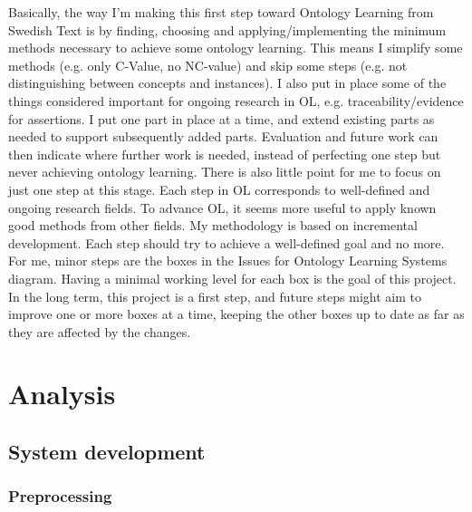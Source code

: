 \documentclass[a4paper]{report}
\begin{document}
Basically, the way I'm making this first step toward Ontology Learning from Swedish Text is by finding, choosing and applying/implementing the minimum methods necessary to achieve some ontology learning. This means I simplify some methods (e.g. only C-Value, no NC-value) and skip some steps (e.g. not distinguishing between concepts and instances). I also put in place some of the things considered important for ongoing research in OL, e.g. traceability/evidence for assertions. I put one part in place at a time, and extend existing parts as needed to support subsequently added parts. Evaluation and future work can then indicate where further work is needed, instead of perfecting one step but never achieving ontology learning. There is also little point for me to focus on just one step at this stage. Each step in OL corresponds to well-defined and ongoing research fields. To advance OL, it seems more useful to apply known good methods from other fields. My methodology is based on incremental development. Each step should try to achieve a well-defined goal and no more. For me, minor steps are the boxes in the Issues for Ontology Learning Systems diagram. Having a minimal working level for each box is the goal of this project. In the long term, this project is a first step, and future steps might aim to improve one or more boxes at a time, keeping the other boxes up to date as far as they are affected by the changes.

\chapter{Analysis}
\label{chapter:analysis}

\section{System development}

\subsection{Preprocessing}
\end{document}
